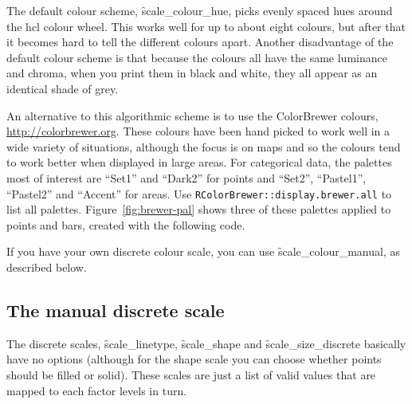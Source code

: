 The default colour scheme, \f{scale_colour_hue}, picks evenly spaced hues around the hcl colour wheel.  This works well for up to about eight colours, but after that it becomes hard to tell the different colours apart.  Another disadvantage of the default colour scheme is that because the colours all have the same luminance and chroma, when you print them in black and white, they all appear as an identical shade of grey.

An alternative to this algorithmic scheme is to use the ColorBrewer colours, \url{http://colorbrewer.org}. These colours have been hand picked to work well in a wide variety of situations, although the focus is on maps and so the colours tend to work better when displayed in large areas. For categorical data, the palettes most of interest are ``Set1'' and ``Dark2'' for points and ``Set2'', ``Pastel1'', ``Pastel2'' and ``Accent'' for areas. Use {\tt RColorBrewer::display.brewer.all} to list all palettes. Figure~\ref{fig:brewer-pal} shows three of these palettes applied to points and bars, created with the following code.

% 
% 


If you have your own discrete colour scale, you can use \f{scale_colour_manual}, as described below.

\subsection{The manual discrete scale}
\label{sub:scale-discrete}

The discrete scales, \f{scale_linetype}, \f{scale_shape} and \f{scale_size_discrete} basically have no options (although for the shape scale you can choose whether points should be filled or solid). These scales are just a list of valid values that are mapped to each factor levels in turn.

